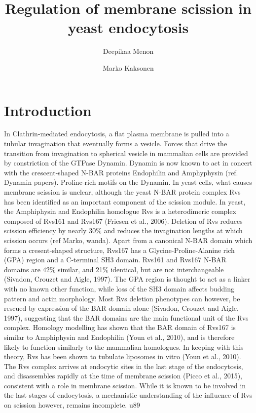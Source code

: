 \documentclass[9pt,lineno]{elife}
\title{Regulation of membrane scission in yeast endocytosis}
\author[1]{Deepikaa Menon}
\author[1*]{Marko Kaksonen}
\affil[1]{Department of Biochemistry, University of Geneva, Geneva, Switzerland}
\begin{document}
\maketitle

\begin{abstract}

\end{abstract}


\section{Introduction}

In Clathrin-mediated endocytosis, a flat plasma membrane is pulled into a tubular invagination that eventually forms a vesicle. Forces that drive the transition from invagination to spherical vesicle in mammalian cells are provided by constriction of the GTPase Dynamin. Dynamin is now known to act in concert with the crescent-shaped N-BAR proteins Endophilin and Amphyphysin (ref. Dynamin papers). Proline-rich motifs on the Dynamin. In yeast cells, what causes membrane scission is unclear, although the yeast N-BAR protein complex Rvs has been identified as an important component of the scission module.  In yeast, the Amphiphysin and Endophilin homologue Rvs is a heterodimeric complex composed of Rvs161 and Rvs167 (Friesen et al., 2006). Deletion of Rvs reduces scission efficiency by nearly 30\% and reduces the invagination lengths at which scission occurs (ref Marko, wanda). Apart from a canonical N-BAR domain which forms a cresent-shaped structure,  Rvs167 has a Glycine-Proline-Alanine rich (GPA) region and a C-terminal SH3 domain. Rvs161 and Rvs167 N-BAR domains are 42\% similar, and 21\% identical, but are not interchangeable (Sivadon, Crouzet and Aigle, 1997). The GPA region is thought to act as a linker with no known other function, while loss of the SH3 domain affects budding pattern and actin morphology. Most Rvs deletion phenotypes can however, be rescued by expression of the BAR domain alone (Sivadon, Crouzet and Aigle, 1997), suggesting that the BAR domains are the main functional unit of the Rvs complex. Homology modelling has shown that the BAR domain of Rvs167 is similar to Amphiphysin and Endophilin (Youn et al., 2010), and is therefore likely to function similarly to the mammalian homologues. In keeping with this theory, Rvs has been shown to tubulate liposomes in vitro (Youn et al., 2010). The Rvs complex arrives at endocytic sites in the last stage of the endocytosis, and disassembles rapidly at the time of membrane scission (Picco et al., 2015), consistent with a role in membrane scission. While it is known to be involved in the last stages of endocytosis, a mechanistic understanding of the influence of Rvs on scission however, remains incomplete. u89
\end{document}
